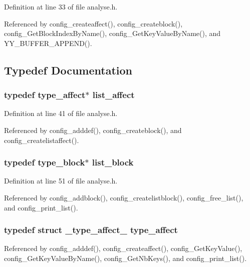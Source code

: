 Definition at line 33 of file analyse.h.

Referenced by config\_\-createaffect(), config\_\-createblock(), config\_\-Get\-Block\-Index\-By\-Name(), config\_\-Get\-Key\-Value\-By\-Name(), and YY\_\-BUFFER\_\-APPEND().

\subsection{Typedef Documentation}
\subsubsection{\setlength{\rightskip}{0pt plus 5cm}typedef {\bf type\_\-affect}$\ast$ {\bf list\_\-affect}}\label{analyse_8h_a2}




Definition at line 41 of file analyse.h.

Referenced by config\_\-adddef(), config\_\-createblock(), and config\_\-createlistaffect().
\subsubsection{\setlength{\rightskip}{0pt plus 5cm}typedef {\bf type\_\-block}$\ast$ {\bf list\_\-block}}\label{analyse_8h_a4}




Definition at line 51 of file analyse.h.

Referenced by config\_\-addblock(), config\_\-createlistblock(), config\_\-free\_\-list(), and config\_\-print\_\-list().
\subsubsection{\setlength{\rightskip}{0pt plus 5cm}typedef struct {\bf \_\-type\_\-affect\_\-} {\bf type\_\-affect}}\label{analyse_8h_a1}




Referenced by config\_\-adddef(), config\_\-createaffect(), config\_\-Get\-Key\-Value(), config\_\-Get\-Key\-Value\-By\-Name(), config\_\-Get\-Nb\-Keys(), and config\_\-print\_\-list().
